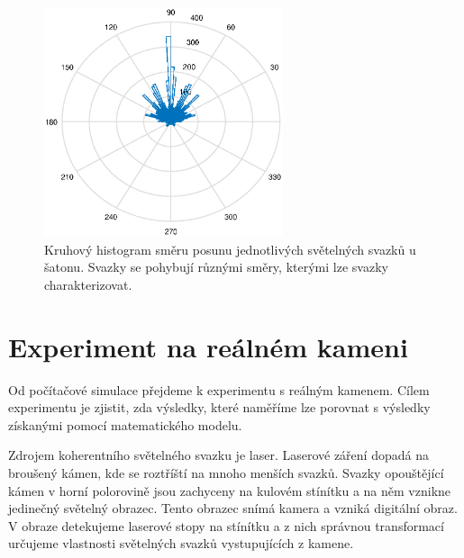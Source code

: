 \begin{figure}[h!]
\begin{center}
\includegraphics[width = 7cm]{figures/saton_smer.eps}
\end{center}
\caption{Kruhový histogram směru posunu jednotlivých světelných svazků u šatonu. Svazky se pohybují různými směry, kterými lze svazky charakterizovat.}

\label{fig:kruhovy histogram saton}
\end{figure}

\newpage


\section*{Experiment na reálném kameni}
Od počítačové simulace přejdeme k experimentu s reálným kamenem. Cílem experimentu je zjistit, zda výsledky, které naměříme lze porovnat s výsledky získanými pomocí matematického modelu. 

Zdrojem koherentního světelného svazku je laser. Laserové záření dopadá na broušený kámen, kde se roztříští na mnoho menších svazků. Svazky opouštějící kámen v horní polorovině jsou zachyceny na kulovém stínítku a na něm vznikne jedinečný světelný obrazec. Tento obrazec snímá kamera a vzniká digitální obraz. V obraze detekujeme laserové stopy na stínítku a z nich správnou transformací určujeme vlastnosti světelných svazků vystupujících z kamene. 

